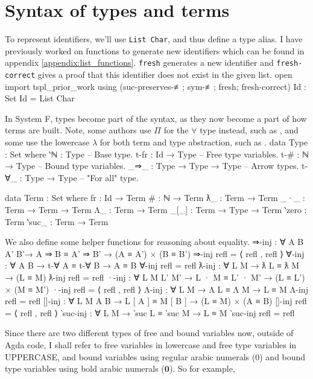 \documentclass[logo,bsc,singlespacing,parskip,online]{infthesis}
\renewenvironment{code}{\mintedcopy[breaklines,breaksymbolleft=\;]{agda}}{\endmintedcopy}
\begin{document}
\section{Syntax of types and terms}
To represent identifiers, we'll use \texttt{List Char}, and thus define a type alias. I have
previously worked on functions to generate new identifiers which can be found in appendix
\ref{appendix:list_functions}. \texttt{fresh} generates a new identifier and \texttt{fresh-correct}
gives a proof that this identifier does not exist in the given list.
\begin{code}
  open import tspl_prior_work
    using (suc-preserves-≢; sym-≢; fresh; fresh-correct)
  Id : Set
  Id = List Char
\end{code}

In System F, types become part of the syntax, as they now become a part of how terms are built.
Note, some authors use $\Pi$ for the $\forall$ type instead, such as \citet{hutton_system_2019}, and
some use the lowercase $\lambda$ for both term and type abstraction, such as
\citet{pierce_types_2002}.
\begin{code}
  data Type : Set where
    ‵ℕ      : Type                 -- Base type.
    t-fr     : Id → Type           -- Free type variables.
    t-#      : ℕ → Type            -- Bound type variables.
    _⇒_      : Type → Type → Type  -- Arrow types.
    t-∀_     : Type → Type         -- "For all" type.

  data Term : Set where
    fr     : Id → Term
    #      : ℕ → Term
    ƛ_     : Term → Term
    _·_    : Term → Term → Term
    Λ_     : Term → Term
    _[_]   : Term → Type → Term
    ‵zero  : Term
    ‵suc_  : Term → Term
\end{code}

We also define some helper functions for reasoning about equality.
\begin{code}
  ⇒-inj : ∀ {A B A' B'}→ A ⇒ B ≡ A' ⇒ B' → (A ≡ A') × (B ≡ B')
  ⇒-inj refl = ⟨ refl , refl ⟩
  ∀-inj : ∀ {A B} → t-∀ A ≡ t-∀ B → A ≡ B
  ∀-inj refl = refl
  ƛ-inj : ∀ {L M} → ƛ L ≡ ƛ M → (L ≡ M)
  ƛ-inj refl = refl
  ·-inj : ∀ {L M L' M'} → L · M ≡ L' · M' → (L ≡ L') × (M ≡ M')
  ·-inj refl = ⟨ refl , refl ⟩
  Λ-inj : ∀ {L M} → Λ L ≡ Λ M → L ≡ M
  Λ-inj refl = refl
  []-inj : ∀ {L M A B} → L [ A ] ≡ M [ B ] → (L ≡ M) × (A ≡ B)
  []-inj refl = ⟨ refl , refl ⟩
  ‵suc-inj : ∀ {L M} → ‵suc L ≡ ‵suc M → L ≡ M
  ‵suc-inj refl = refl
\end{code}

Since there are two different types of free and bound variables now, outside of Agda code, I shall
refer to free variables in lowercase and free type variables in UPPERCASE, and bound variables using
regular arabic numerals ($0$) and bound type variables using bold arabic numerals ($\mathbf{0}$). So
for example,
\end{document}
